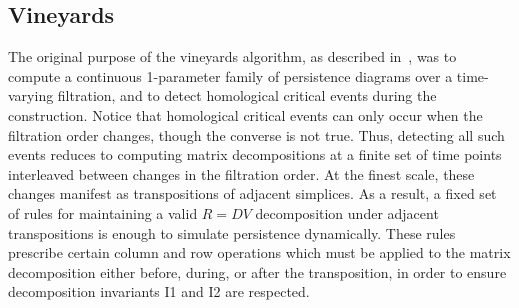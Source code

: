 \documentclass{article} %
\begin{document}
\subsection{Vineyards}\label{sec:vineyards}
The original purpose of the vineyards algorithm, as described in~\cite{cohen2006vines}, was to compute a continuous 1-parameter family of persistence diagrams over a time-varying filtration, and to detect homological critical events during the construction.
Notice that homological critical events can only occur when the filtration order changes, though the converse is not true.
Thus, detecting  all such events reduces to computing matrix decompositions at a finite set of time points interleaved between changes in the filtration order. 
At the finest scale, these changes manifest as transpositions of adjacent simplices. 
As a result, a fixed set of rules for maintaining a valid $R = D V$ decomposition under adjacent transpositions  is enough to simulate persistence dynamically. 
These rules prescribe certain column and row operations which must be applied to the matrix decomposition either before, during, or after the transposition, in order to ensure decomposition invariants I1 and I2 are respected.   
\end{document}
